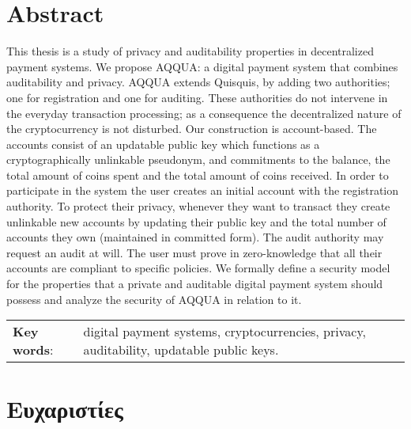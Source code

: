 \chapter*{Abstract}
This thesis is a study of privacy and auditability properties in decentralized payment systems.
We propose AQQUA: a digital payment system that combines auditability and privacy.
AQQUA extends Quisquis, by adding two authorities; one for registration and one for auditing.
These authorities do not intervene in the everyday transaction processing; as a consequence the decentralized nature of the cryptocurrency is not disturbed. 
Our construction is account-based. 
The accounts consist of an updatable public key which functions as a cryptographically unlinkable pseudonym,
and commitments to the balance, the total amount of coins spent and the total amount of coins received.
In order to participate in the system the user creates an initial account with the registration authority. 
To protect their privacy, whenever they want to transact they create unlinkable new accounts by updating their public key and the total number of accounts they own (maintained in committed form). 
The audit authority may request an audit at will. The user must prove in zero-knowledge that all their accounts are compliant to  specific policies.
We formally define a security model for the properties that a private and auditable digital payment system should possess and analyze the security of AQQUA in relation to it. 
\vspace{20ex}


\begin{table}[ht]
    \centering
    \begin{tabular}{p{\mylen} p{\linewidth - \mylen}}
      \textbf{Key words}: & digital payment systems, cryptocurrencies, privacy, auditability, updatable public keys. \\
    \end{tabular}
\end{table}

\newpage
\hspace{10pt}

\newpage
\chapter*{Ευχαριστίες}
